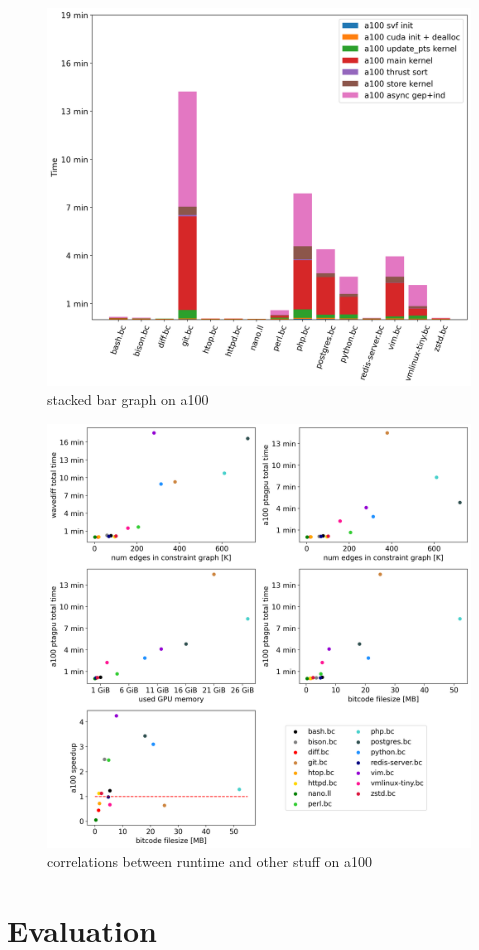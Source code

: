 \begin{figure}
    \centering
    \includegraphics[width=.9\textwidth]{img/stackedbar-a100.png}
    \caption{stacked bar graph on a100}
    \label{fig:stackedbar-a100}
\end{figure}

\begin{figure}
    \centering
    \includegraphics[width=.9\textwidth]{img/correlations-a100.png}
    \caption{correlations between runtime and other stuff on a100}
    \label{fig:correlations-a100}
\end{figure}

\section{Evaluation}
